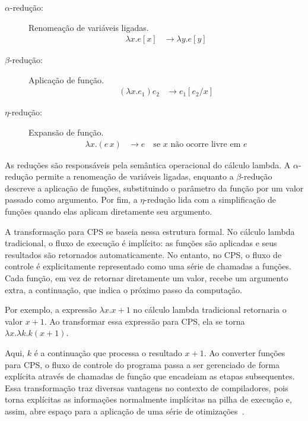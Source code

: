 \begin{description}
  \item[$\alpha$-redução:] Renomeação de variáveis ligadas.
        \begin{align}
          \lambda x . e[x] & \rightarrow \lambda y . e[y]\label{eq:alpha-reduction}
        \end{align}

  \item[$\beta$-redução:] Aplicação de função.
        \begin{align}
          (\lambda x . e_1) e_2 & \rightarrow e_1 [e_2 / x]\label{eq:beta-reduction}
        \end{align}

  \item[$\eta$-redução:] Expansão de função.
        \begin{align}
          \lambda x . (e \, x) & \rightarrow e \quad \text{se } x \text{ não ocorre livre em } e\label{eq:eta-reduction}
        \end{align}
\end{description}

As reduções são responsáveis pela semântica operacional do cálculo lambda.
A $\alpha$-redução permite a renomeação de variáveis ligadas, enquanto a $\beta$-redução descreve a aplicação de funções, substituindo o parâmetro da função por um valor passado como argumento.
Por fim, a $\eta$-redução lida com a simplificação de funções quando elas aplicam diretamente seu argumento.

A transformação para CPS se baseia nessa estrutura formal.
No cálculo lambda tradicional, o fluxo de execução é implícito: as funções são aplicadas e seus resultados são retornados automaticamente.
No entanto, no CPS, o fluxo de controle é explicitamente representado como uma série de chamadas a funções.
Cada função, em vez de retornar diretamente um valor, recebe um argumento extra, a continuação, que indica o próximo passo da computação.

Por exemplo, a expressão $\lambda x. x + 1$ no cálculo lambda tradicional retornaria o valor $x + 1$. Ao transformar essa expressão para CPS, ela se torna $\lambda x. \lambda k. k (x + 1)$.

Aqui, $k$ é a continuação que processa o resultado $x + 1$.
Ao converter funções para CPS, o fluxo de controle do programa passa a ser gerenciado de forma explícita através de chamadas de função que encadeiam as etapas subsequentes.
Essa transformação traz diversas vantagens no contexto de compiladores, pois torna explícitas as informações normalmente implícitas na pilha de execução e, assim, abre espaço para a aplicação de uma série de otimizações~\cite{appel1992compiling}.  

